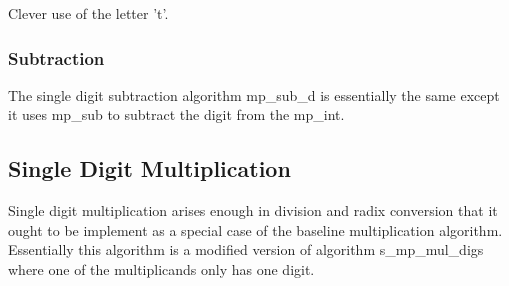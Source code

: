 \documentclass[b5paper]{book}
\begin{document}
Clever use of the letter 't'.

\subsubsection{Subtraction}
The single digit subtraction algorithm mp\_sub\_d is essentially the same except it uses mp\_sub to subtract the digit from the mp\_int.

\subsection{Single Digit Multiplication}
Single digit multiplication arises enough in division and radix conversion that it ought to be implement as a special case of the baseline
multiplication algorithm.  Essentially this algorithm is a modified version of algorithm s\_mp\_mul\_digs where one of the multiplicands
only has one digit.
\end{document}
